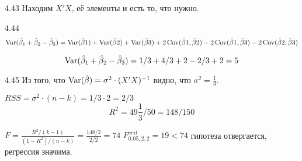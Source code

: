 \begin{solution}{{4.43}}
Находим $X'X$, её элементы и есть то, что нужно.
\end{solution}
\protect \hypertarget {soln:4.44}{}
\begin{solution}{{4.44}}
\[\operatorname{Var}(\hat{\beta}_1+\hat{\beta}_2-\hat{\beta}_3)=\operatorname{Var}(\hat{\beta}1)+\operatorname{Var}(\hat{\beta}2)+\operatorname{Var}(\hat{\beta}3)+
2\operatorname{Cov}(\hat{\beta}1,\hat{\beta}2)-2\operatorname{Cov}(\hat{\beta}1,\hat{\beta}3)-2\operatorname{Cov}(\hat{\beta}2,\hat{\beta}3)\]

\[\operatorname{Var}(\hat{\beta}_1+\hat{\beta}_2-\hat{\beta}_3)=1/3+4/3+2-2/3+2=5\]
\end{solution}
\protect \hypertarget {soln:4.45}{}
\begin{solution}{{4.45}}
Из того, что $\operatorname{Var}(\hat{\beta})=\sigma^2\cdot (X'X)^{-1}$ видно, что $\sigma^2=\frac13$.

$RSS=\sigma^2\cdot(n-k)=1/3\cdot 2=2/3$
\[R^2=49\frac13/50=148/150\]


$F=\frac{R^2/(k-1)}{(1-R^2)/(n-k)}=\frac{148/2}{2/2}=74$
$F^{crit}_{0.05, 2,2}=19<74$
гипотеза отвергается, регрессия значима.

\end{solution}
\protect \hypertarget {soln:4.46}{}
